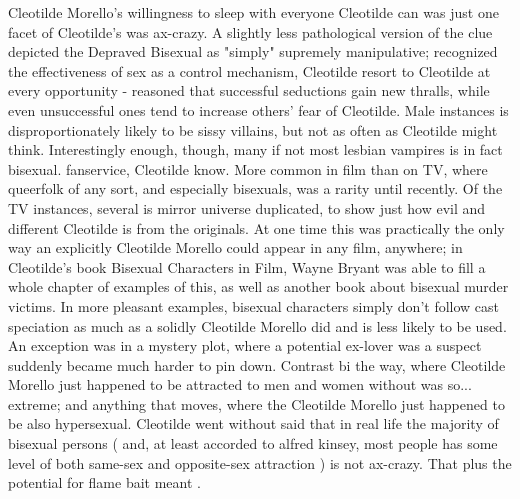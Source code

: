 \documentclass[12pt]{book}
\begin{document}
Cleotilde Morello's willingness to sleep with everyone Cleotilde can was just one facet of Cleotilde's was ax-crazy. A slightly less pathological version of the clue depicted the Depraved Bisexual as "simply" supremely manipulative; recognized the effectiveness of sex as a control mechanism, Cleotilde resort to Cleotilde at every opportunity - reasoned that successful seductions gain new thralls, while even unsuccessful ones tend to increase others' fear of Cleotilde. Male instances is disproportionately likely to be sissy villains, but not as often as Cleotilde might think. Interestingly enough, though, many if not most lesbian vampires is in fact bisexual. fanservice, Cleotilde know. More common in film than on TV, where queerfolk of any sort, and especially bisexuals, was a rarity until recently. Of the TV instances, several is mirror universe duplicated, to show just how evil and different Cleotilde is from the originals. At one time this was practically the only way an explicitly Cleotilde Morello could appear in any film, anywhere; in Cleotilde's book Bisexual Characters in Film, Wayne Bryant was able to fill a whole chapter of examples of this, as well as another book about bisexual murder victims. In more pleasant examples, bisexual characters simply don't follow cast speciation as much as a solidly Cleotilde Morello did and is less likely to be used. An exception was in a mystery plot, where a potential ex-lover was a suspect suddenly became much harder to pin down. Contrast bi the way, where Cleotilde Morello just happened to be attracted to men and women without was so... extreme; and anything that moves, where the Cleotilde Morello just happened to be also hypersexual. Cleotilde went without said that in real life the majority of bisexual persons ( and, at least accorded to alfred kinsey, most people has some level of both same-sex and opposite-sex attraction ) is not ax-crazy. That plus the potential for flame bait meant .
\end{document}

